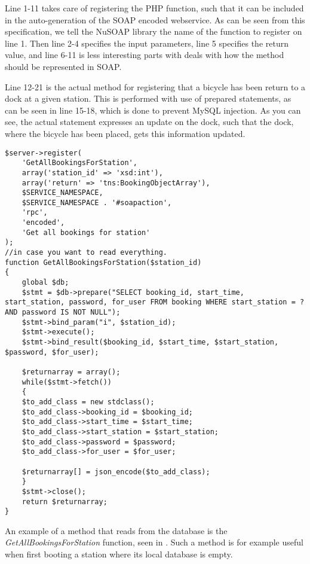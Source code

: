 Line 1-11 takes care of registering the PHP function, such that it can be included in the auto-generation of the SOAP encoded webservice.
As can be seen from this specification, we tell the NuSOAP library the name of the function to register on line 1.
Then line 2-4 specifies the input parameters, line 5 specifies the return value, and line 6-11 is less interesting parts with deals with how the method should be represented in SOAP.

Line 12-21 is the actual method for registering that a bicycle has been return to a dock at a given station.
This is performed with use of prepared statements, as can be seen in line 15-18, which is done to prevent MySQL injection.
As you can see, the actual statement expresses an update on the dock, such that the dock, where the bicycle has been placed, gets this information updated.

\begin{minipage}{\textwidth}
\begin{lstlisting}[caption = {Method for reading all bookings for a given station}, label = {lst:getallbookingstation}]
$server->register(
	'GetAllBookingsForStation',
	array('station_id' => 'xsd:int'),
	array('return' => 'tns:BookingObjectArray'),
	$SERVICE_NAMESPACE,
	$SERVICE_NAMESPACE . '#soapaction',
	'rpc',
	'encoded',
	'Get all bookings for station'
);
//in case you want to read everything.
function GetAllBookingsForStation($station_id)
{
	global $db;
	$stmt = $db->prepare("SELECT booking_id, start_time, start_station, password, for_user FROM booking WHERE start_station = ? AND password IS NOT NULL");
	$stmt->bind_param("i", $station_id);
	$stmt->execute();
	$stmt->bind_result($booking_id, $start_time, $start_station, $password, $for_user);
	
	$returnarray = array();
	while($stmt->fetch())
	{
	$to_add_class = new stdclass();
	$to_add_class->booking_id = $booking_id;
	$to_add_class->start_time = $start_time;
	$to_add_class->start_station = $start_station;
	$to_add_class->password = $password;
	$to_add_class->for_user = $for_user;
	
	$returnarray[] = json_encode($to_add_class);
	}
	$stmt->close();
	return $returnarray;
}
\end{lstlisting}
\end{minipage}

An example of a method that reads from the database is the \textit{GetAllBookingsForStation} function, seen in .
Such a method is for example useful when first booting a station where its local database is empty.

